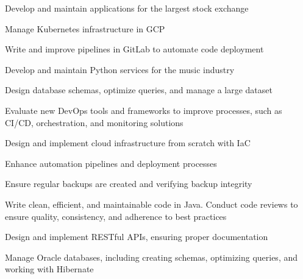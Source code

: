 \documentclass[]{willianpaixao-resume}
\begin{document}
\begin{minipage}[t]{0.64\textwidth}
\begin{tightemize}
\item Develop and maintain applications for the largest stock exchange
\item Manage Kubernetes infrastructure in GCP
\item Write and improve pipelines in GitLab to automate code deployment
\end{tightemize}
\sectionsep

\begin{tightemize}
\item Develop and maintain Python services for the music industry
\item Design database schemas, optimize queries, and manage a large dataset
\item Evaluate new DevOps tools and frameworks to improve processes, such as CI/CD, orchestration, and monitoring solutions
\end{tightemize}
\sectionsep

\begin{tightemize}
\item Design and implement cloud infrastructure from scratch with IaC
\item Enhance automation pipelines and deployment processes
\item Ensure regular backups are created and verifying backup integrity
\end{tightemize}
\sectionsep

\begin{tightemize}
\item Write clean, efficient, and maintainable code in Java. Conduct code reviews to ensure quality, consistency, and adherence to best practices
\item Design and implement RESTful APIs, ensuring proper documentation
\item Manage Oracle databases, including creating schemas, optimizing queries, and working with Hibernate
\end{tightemize}
\end{minipage}
\end{document}
